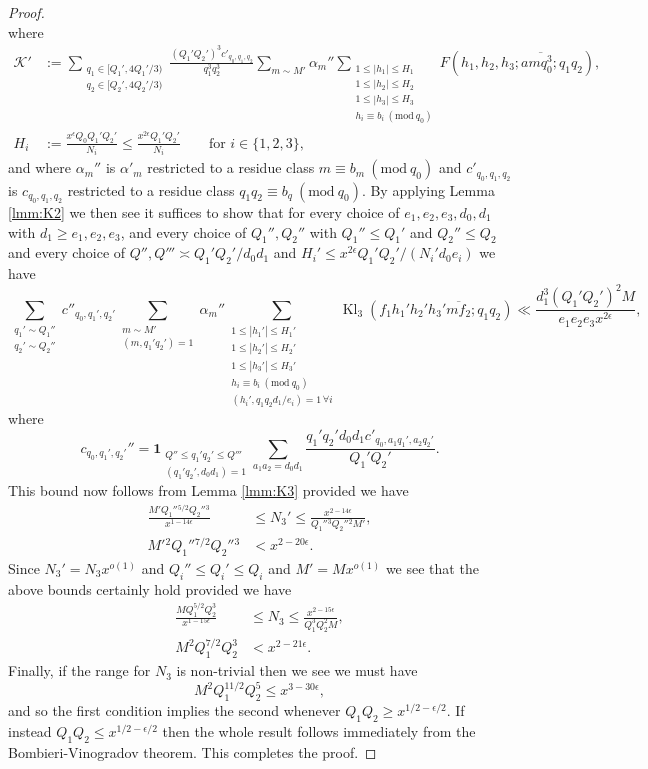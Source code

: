 \documentclass[10pt]{amsart}
\theoremstyle{plain}
\numberwithin{equation}{section}
\DeclareMathOperator{\Kl}{Kl}
\newcommand{\Mod}[1]{\ (\mathrm{mod}\ #1)}
\begin{document}
\begin{proof}
\[\]
where 
\begin{align*}
\mathscr{K}'&:=\sum_{\substack{q_1\in[Q_1',4Q_1'/3)\\ q_2\in [Q_2',4Q_2'/3)}}\frac{(Q_1'Q_2')^3 c'_{q_0,q_1,q_2}}{q_1^3 q_2^3}\sum_{m\sim M'}\alpha_m''\sum_{\substack{1\le |h_1|\le H_1\\ 1\le |h_2|\le H_2\\ 1\le |h_3|\le H_3\\ h_i\equiv b_i\Mod{q_0}}}F(h_1,h_2,h_3;a\overline{mq_0^3};q_1q_2),\\
H_i&:=\frac{x^\epsilon Q_0Q_1'Q_2'}{N_i}\le \frac{x^{2\epsilon}Q_1'Q_2'}{N_i}\qquad \text{for }i\in\{1,2,3\},
\end{align*}
and where $\alpha_m''$ is $\alpha'_m$ restricted to a residue class $m\equiv b_m\Mod{q_0}$ and $c'_{q_0,q_1,q_2}$ is $c_{q_0,q_1,q_2}$ restricted to a residue class $q_1q_2\equiv b_q\Mod{q_0}$. By applying Lemma \ref{lmm:K2} we then see it suffices to show that for every choice of $e_1,e_2,e_3,d_0,d_1$ with $d_1\ge e_1,e_2,e_3$, and every choice of $Q_1'',Q_2''$ with $Q_1''\le Q_1'$ and $Q_2''\le Q_2$ and every choice of $Q'',Q'''\asymp Q_1'Q_2'/d_0d_1$ and $H_i'\le x^{2\epsilon} Q_1'Q_2'/(N_i' d_0e_i)$ we have
\[
\sum_{\substack{q_1'\sim Q_1''\\ q_2'\sim Q_2''}}c''_{q_0,q_1',q_2'}\sum_{\substack{m\sim M'\\ (m,q_1'q_2')=1}}\alpha_m''\sum_{\substack{1\le |h_1'|\le H_1'\\ 1\le |h_2'|\le H_2'\\ 1\le |h_3'|\le H_3'\\ h_i\equiv b_i\Mod{q_0}\\ (h_i',q_1q_2 d_1/e_i)=1\,\forall i}}\Kl_3(f_1h_1'h_2'h_3'\overline{m f_2};q_1q_2)\ll \frac{d_1^3(Q_1'Q_2')^2 M}{e_1e_2e_3x^{2\epsilon}},
\]
where 
\[
c_{q_0,q_1',q_2'}''=\mathbf{1}_{\substack{Q''\le q_1'q_2'\le Q'''\\ (q_1'q_2',d_0d_1)=1}}\sum_{a_1a_2=d_0d_1}\frac{q_1' q_2' d_0d_1 c'_{q_0,a_1q_1',a_2q_2'}}{Q_1' Q_2'}.
\]
This bound now follows from Lemma \ref{lmm:K3} provided we have
\begin{align*}
\frac{M' Q_1''{}^{5/2}Q_2''{}^3}{x^{1-14\epsilon}}&\le N_3'\le \frac{x^{2-14\epsilon}}{Q_1''{}^3Q_2''{}^2 M'},\\
M'{}^2 Q_1''{}^{7/2}Q_2''{}^3&<x^{2-20\epsilon}.
\end{align*}
Since $N_3'=N_3x^{o(1)}$ and $Q_i''\le Q_i'\le Q_i$ and $M'=M x^{o(1)}$ we see that the above bounds certainly hold provided we have
\begin{align*}
\frac{M Q_1^{5/2}Q_2^3}{x^{1-15\epsilon}}&\le N_3\le \frac{x^{2-15\epsilon}}{Q_1^3Q_2^2 M},\\
M^2 Q_1^{7/2}Q_2^3&<x^{2-21\epsilon}.
\end{align*}
Finally, if the range for $N_3$ is non-trivial then we see we must have
\[
M^2 Q_1^{11/2}Q_2^{5}\le x^{3-30\epsilon},
\]
and so the first condition implies the second whenever $Q_1Q_2\ge x^{1/2-\epsilon/2}$. If instead $Q_1Q_2\le x^{1/2-\epsilon/2}$ then the whole result follows immediately from the Bombieri-Vinogradov theorem. This completes the proof.
\end{proof}
\end{document}
